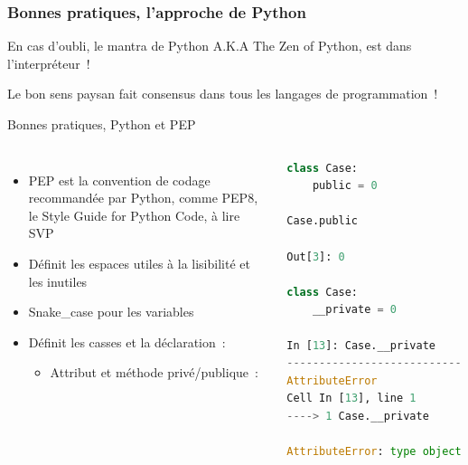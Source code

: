 \documentclass{beamer}
\begin{document}
    \begin{frame}[fragile]
        \transdissolve
        \frametitle{Bonnes pratiques, l'approche de Python}
        En cas d'oubli, le mantra de Python A.K.A The Zen of Python, est dans l'interpréteur~!

        \bigbreak

        Le bon sens paysan fait consensus dans tous les langages de programmation~!

    \end{frame}

    \begin{frame}[fragile]{Bonnes pratiques, Python et PEP}
        \begin{columns}
            \begin{itemize}
                \item PEP est la convention de codage recommandée par Python, comme PEP8, le Style Guide for Python Code, à lire SVP
                \item Définit les espaces utiles à la lisibilité et les inutiles
                \item Snake\_case pour les variables
                \item Définit les casses et la déclaration~:
                \begin{itemize}
                    \item Attribut et méthode privé/publique~:
                \end{itemize}
            \end{itemize}
            \begin{lstlisting}[language=python]
class Case:
    public = 0

Case.public

Out[3]: 0

class Case:
    __private = 0

In [13]: Case.__private
---------------------------------------------------------------------------
AttributeError                            Traceback (most recent call last)
Cell In [13], line 1
----> 1 Case.__private

AttributeError: type object 'Case' has no attribute '__private'
            \end{lstlisting}
        \end{columns}
    \end{frame}
\end{document}

